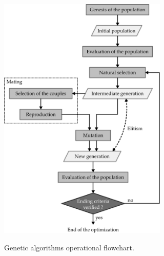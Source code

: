 \documentclass{ametsoc}
\begin{document}
\begin{figure}[t]
	\begin{center}
		\noindent\includegraphics[width=19pc,angle=0]{fig04.pdf}\\
	\end{center}
	\caption{Genetic algorithms operational flowchart.}
	\label{fig:structure_gas}
\end{figure}
\end{document}

